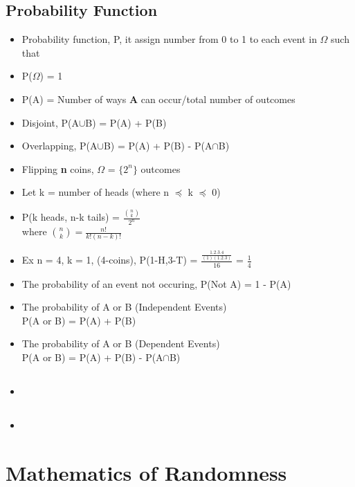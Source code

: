 \documentclass[13pt]{book}
\begin{document}
\subsection{Probability Function}
\begin{itemize}
\item Probability function, P, it assign number from 0 to 1 to each event in \(\Omega\) such that 
  \item P(\(\Omega\)) = 1
  \item P(A) = Number of ways \textbf{ A } can occur/total number of outcomes
  \item Disjoint, P(A\(\cup\)B) = P(A) + P(B)
  \item Overlapping, P(A\(\cup\)B) = P(A) + P(B) - P(A\(\cap\)B)
  \item Flipping \textbf{n} coins, \(\Omega\) = \(\{ 2^n\}\) outcomes
  \item Let k = number of heads (where n \(\preceq\) k \(\preceq\) 0)
  \item P(k heads, n-k tails) = \(\frac{\binom{n}{k}}{2^n}\) \\
    where \(\binom{n}{k} = \frac{n!}{k!(n-k)!}\)
  \item Ex n = 4, k = 1, (4-coins), P(1-H,3-T) = \(\frac{\frac{1.2.3.4}{(1)(1.2.3)}}{16}\) = \(\frac{1}{4}\)
  \item The probability of an event not occuring, P(Not A) = 1 - P(A)
  \item The probability of A or B (Independent Events) \\
    P(A or B) = P(A) + P(B)
  \item The probability of A or B (Dependent Events) \\
    P(A or B) = P(A) + P(B) - P(A\(\cap\)B)
  \end{itemize}
\subsection{}
\begin{itemize}
  \item
  \end{itemize}
\subsection{}
\begin{itemize}
  \item
\end{itemize}  
\section{Mathematics of Randomness}
\end{document}
